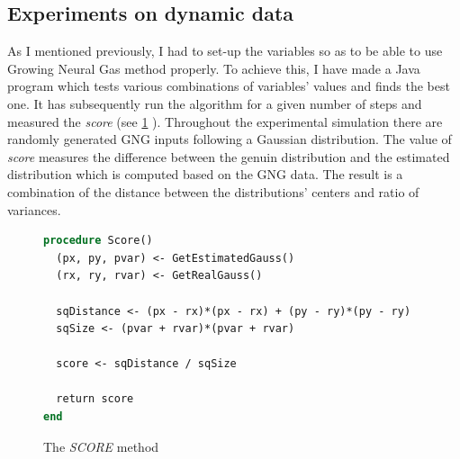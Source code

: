 \subsection{Experiments on dynamic data}

As I mentioned previously, I had to set-up the variables so as to be able to use Growing Neural Gas method properly. To achieve this, I have made a Java program which tests various combinations of variables' values and finds the best one. It has subsequently run the algorithm for a given number of steps and measured the \emph{score} (see \ref{usedalgo:scoremethod} ). Throughout the experimental simulation there are randomly generated GNG inputs following a Gaussian distribution. The value of \emph{score} measures the difference between the genuin distribution and the estimated distribution which is computed based on the GNG data. The result is a combination of the distance between the distributions' centers and ratio of variances.

\begin{figure}
\begin{lstlisting}[language=Pascal]
procedure Score()
  (px, py, pvar) <- GetEstimatedGauss()
  (rx, ry, rvar) <- GetRealGauss()
  
  sqDistance <- (px - rx)*(px - rx) + (py - ry)*(py - ry)
  sqSize <- (pvar + rvar)*(pvar + rvar)
  
  score <- sqDistance / sqSize
  
  return score
end
\end{lstlisting}       
\caption{The \emph{SCORE} method}
\label{usedalgo:scoremethod}
\end{figure}
       
